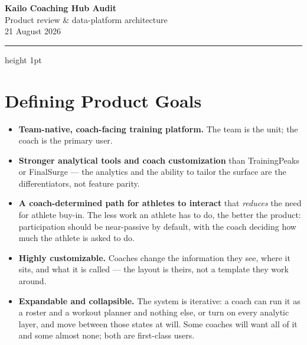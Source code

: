 \documentclass[11pt]{article}
\begin{document}
\begin{center}
  {\LARGE\bfseries\color{kailoink} Kailo Coaching Hub Audit}\\[6pt]
  {\large\color{kailoaccent} Product review \& data-platform architecture}\\[10pt]
  {\normalsize 21 August 2026}
\end{center}
\vspace{0.5em}
\hrule height 1pt
\vspace{1.2em}

\section*{Defining Product Goals}

\begin{itemize}
  \item \textbf{Team-native, coach-facing training platform.} The team is the
    unit; the coach is the primary user.
  \item \textbf{Stronger analytical tools and coach customization} than
    TrainingPeaks or FinalSurge --- the analytics and the ability to tailor the
    surface are the differentiators, not feature parity.
  \item \textbf{A coach-determined path for athletes to interact} that
    \emph{reduces} the need for athlete buy-in. The less work an athlete has to
    do, the better the product: participation should be near-passive by default,
    with the coach deciding how much the athlete is asked to do.
  \item \textbf{Highly customizable.} Coaches change the information they see,
    where it sits, and what it is called --- the layout is theirs, not a
    template they work around.
  \item \textbf{Expandable and collapsible.} The system is iterative: a coach
    can run it as a roster and a workout planner and nothing else, or turn on
    every analytic layer, and move between those states at will. Some coaches
    will want all of it and some almost none; both are first-class users.
\end{itemize}
\end{document}

